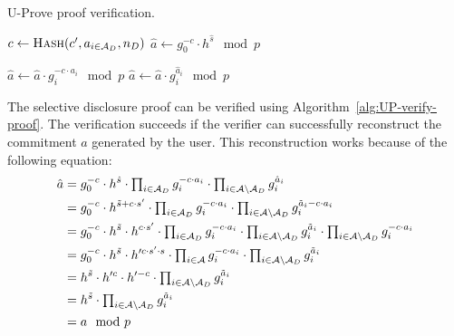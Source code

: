 \begin{algorithm}
  \caption{U-Prove proof verification.}
  \label{alg:UP-verify-proof}
  \addtolength{\baselineskip}{1mm}
  \begin{algorithmic}[1]
      \State $c \gets \Call{Hash}{c', a_{i \in \A_D}, n_D}$
      \State $\hat{a} \gets g_0^{-c} \cdot h^{\hat{s}} \mod p$

        \State $\hat{a} \gets \hat{a} \cdot g_i^{-c \cdot a_i} \mod p$
      \EndFor
        \State $\hat{a} \gets \hat{a} \cdot g_i^{\hat{a}_i} \mod p$
      \EndFor

        \Return {}
      \EndIf

      \Return {}
    \EndFunction
  \end{algorithmic}
\end{algorithm}

The selective disclosure proof can be verified using
Algorithm~\ref{alg:UP-verify-proof}. The verification succeeds if the verifier
can successfully reconstruct the commitment $a$ generated by the user. This
reconstruction works because of the following equation:
\begin{align*}
  \hat{a}
  & = g_0^{-c} \cdot h^{\hat{s}}
    \cdot \textstyle\prod_{i \in \mathcal{A}_D} g_i^{-c \cdot a_i}
    \cdot \textstyle\prod_{i \in \mathcal{A} \setminus \mathcal{A}_D} g_i^{\hat{a}_i} \\
  & = g_0^{-c} \cdot h^{\tilde{s} + c \cdot s'}
    \cdot \textstyle\prod_{i \in \mathcal{A}_D} g_i^{-c \cdot a_i}
    \cdot \textstyle\prod_{i \in \mathcal{A} \setminus \mathcal{A}_D} g_i^{\tilde{a}_i - c \cdot a_i} \\
  & = g_0^{-c} \cdot h^{\tilde{s}} \cdot h^{c \cdot s'}
    \cdot \textstyle\prod_{i \in \mathcal{A}_D} g_i^{-c \cdot a_i}
    \cdot \textstyle\prod_{i \in \mathcal{A} \setminus \mathcal{A}_D} g_i^{\tilde{a}_i}
    \cdot \textstyle\prod_{i \in \mathcal{A} \setminus \mathcal{A}_D} g_i^{- c \cdot a_i} \\
  & = g_0^{-c} \cdot h^{\tilde{s}} \cdot h'^{c \cdot s' \cdot s}
    \cdot \textstyle\prod_{i \in \mathcal{A}} g_i^{-c \cdot a_i}
    \cdot \textstyle\prod_{i \in \mathcal{A} \setminus \mathcal{A}_D} g_i^{\tilde{a}_i} \\
  & = h^{\tilde{s}} \cdot h'^{c} \cdot h'^{-c}
    \cdot \textstyle\prod_{i \in \mathcal{A} \setminus \mathcal{A}_D} g_i^{\tilde{a}_i} \\
  & = h^{\tilde{s}}
    \cdot \textstyle\prod_{i \in \mathcal{A} \setminus \mathcal{A}_D} g_i^{\tilde{a}_i} \\
  & = a \mod p
\end{align*}


